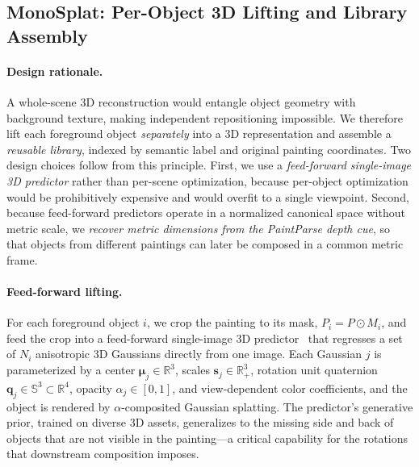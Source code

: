 \subsection{MonoSplat: Per-Object 3D Lifting and Library Assembly}
\label{sec:method:monosplat}

\paragraph{Design rationale.}
A whole-scene 3D reconstruction would entangle object geometry with
background texture, making independent repositioning impossible. We
therefore lift each foreground object \emph{separately} into a 3D
representation and assemble a \emph{reusable library}, indexed by
semantic label and original painting coordinates. Two design choices
follow from this principle. First, we use a \emph{feed-forward
single-image 3D predictor} rather than per-scene optimization, because
per-object optimization would be prohibitively expensive and would
overfit to a single viewpoint. Second, because feed-forward predictors
operate in a normalized canonical space without metric scale, we
\emph{recover metric dimensions from the PaintParse depth cue}, so that
objects from different paintings can later be composed in a common
metric frame.

\paragraph{Feed-forward lifting.}
For each foreground object $i$, we crop the painting to its mask,
$P_i = P \odot M_i$, and feed the crop into a feed-forward single-image
3D predictor~\cite{tripo2025tritosplat} that regresses a set of $N_i$
anisotropic 3D Gaussians
directly from one image. Each Gaussian $j$ is parameterized by a center
$\boldsymbol{\mu}_j \in \mathbb{R}^3$, scales
$\mathbf{s}_j \in \mathbb{R}_{+}^{3}$, rotation unit quaternion
$\mathbf{q}_j \in \mathbb{S}^{3} \subset \mathbb{R}^{4}$, opacity
$\alpha_j \in [0,1]$, and view-dependent color coefficients, and the
object is rendered by $\alpha$-composited Gaussian splatting. The
predictor's generative prior, trained on diverse 3D assets, generalizes
to the missing side and back of objects that are not visible in the
painting---a critical capability for the rotations that downstream
composition imposes.

